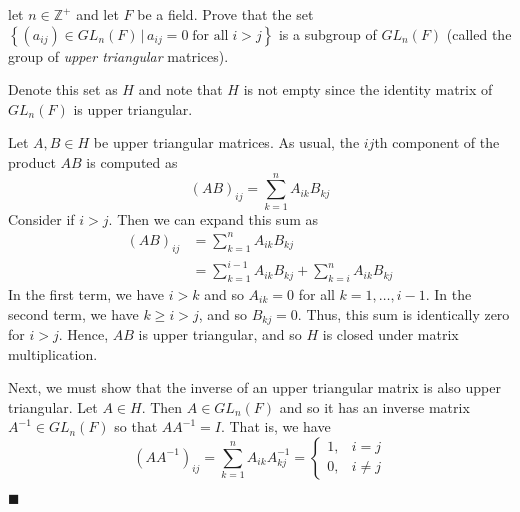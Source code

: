 \documentclass[12pt]{article}
\renewcommand{\qed}{\hfill$\blacksquare$}
\renewenvironment{proof}{\begin{addmargin}[1em]{0em}\begin{newproof}}{\end{newproof}\end{addmargin}\qed}
\newenvironment{problem}[2][Exercise]{\begin{trivlist}
\item[\hskip \labelsep {\bfseries #1}\hskip \labelsep {\bfseries #2.}]}{\end{trivlist}}
\begin{document}
\begin{problem}{1.2.16}
let $n\in \mathbb{Z}^+$ and let $F$ be a field. Prove that the set \\ $\left\{ \left(a_{ij}\right)\in GL_n\left(F\right) \, | \, a_{ij}=0 \; \text{for all} \; i>j \right\}$ is a subgroup of $GL_n\left(F\right)$ (called the group of \textit{upper triangular} matrices).
\end{problem}
\begin{proof}
Denote this set as $H$ and note that $H$ is not empty since the identity matrix of $GL_n\left(F\right)$ is upper triangular. 

Let $A,B\in H$ be upper triangular matrices. As usual, the $ij$th component of the product $AB$ is computed as \[ \left(AB\right)_{ij} = \sum_{k=1}^n A_{ik}B_{kj} \] Consider if $i > j$. Then we can expand this sum as 
\begin{equation}
\begin{split}
\left(AB\right)_{ij} & = \sum_{k=1}^n A_{ik}B_{kj} \\
& = \sum_{k=1}^{i-1} A_{ik}B_{kj} + \sum_{k=i}^n A_{ik}B_{kj}
\end{split}
\end{equation}
In the first term, we have $i>k$ and so $A_{ik} = 0$ for all $k=1,\ldots,i-1$. In the second term, we have $k \geq i > j$, and so $B_{kj} = 0$. Thus, this sum is identically zero for $i>j$. Hence, $AB$ is upper triangular, and so $H$ is closed under matrix multiplication.

Next, we must show that the inverse of an upper triangular matrix is also upper triangular. Let $A\in H$. Then $A\in GL_n\left(F\right)$ and so it has an inverse matrix $A^{-1} \in GL_n\left(F\right)$ so that $AA^{-1} = I$. That is, we have \[ \left(AA^{-1}\right)_{ij} = \sum_{k=1}^n A_{ik}A^{-1}_{kj} =\left\{  \begin{array}{lr} 1, & i=j \\ 0, & i\neq j  \end{array} \right. \] 

\end{proof}
\end{document}
